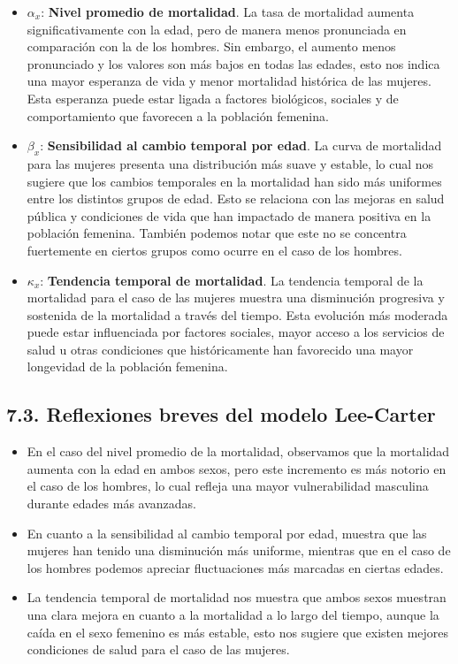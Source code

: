 \documentclass[
]{article}
\begin{document}
\begin{itemize}
\item
  \(\alpha_x\): \textbf{Nivel promedio de mortalidad}. La tasa de
  mortalidad aumenta significativamente con la edad, pero de manera
  menos pronunciada en comparación con la de los hombres. Sin embargo,
  el aumento menos pronunciado y los valores son más bajos en todas las
  edades, esto nos indica una mayor esperanza de vida y menor mortalidad
  histórica de las mujeres. Esta esperanza puede estar ligada a factores
  biológicos, sociales y de comportamiento que favorecen a la población
  femenina.
\item
  \(\beta_x\): \textbf{Sensibilidad al cambio temporal por edad}. La
  curva de mortalidad para las mujeres presenta una distribución más
  suave y estable, lo cual nos sugiere que los cambios temporales en la
  mortalidad han sido más uniformes entre los distintos grupos de edad.
  Esto se relaciona con las mejoras en salud pública y condiciones de
  vida que han impactado de manera positiva en la población femenina.
  También podemos notar que este no se concentra fuertemente en ciertos
  grupos como ocurre en el caso de los hombres.
\item
  \(\kappa_x\): \textbf{Tendencia temporal de mortalidad}. La tendencia
  temporal de la mortalidad para el caso de las mujeres muestra una
  disminución progresiva y sostenida de la mortalidad a través del
  tiempo. Esta evolución más moderada puede estar influenciada por
  factores sociales, mayor acceso a los servicios de salud u otras
  condiciones que históricamente han favorecido una mayor longevidad de
  la población femenina.
\end{itemize}

\hypertarget{reflexiones-breves-del-modelo-lee-carter}{%
\subsection{7.3. Reflexiones breves del modelo
Lee-Carter}\label{reflexiones-breves-del-modelo-lee-carter}}

\begin{itemize}
\item
  En el caso del nivel promedio de la mortalidad, observamos que la
  mortalidad aumenta con la edad en ambos sexos, pero este incremento es
  más notorio en el caso de los hombres, lo cual refleja una mayor
  vulnerabilidad masculina durante edades más avanzadas.
\item
  En cuanto a la sensibilidad al cambio temporal por edad, muestra que
  las mujeres han tenido una disminución más uniforme, mientras que en
  el caso de los hombres podemos apreciar fluctuaciones más marcadas en
  ciertas edades.
\item
  La tendencia temporal de mortalidad nos muestra que ambos sexos
  muestran una clara mejora en cuanto a la mortalidad a lo largo del
  tiempo, aunque la caída en el sexo femenino es más estable, esto nos
  sugiere que existen mejores condiciones de salud para el caso de las
  mujeres.
\end{itemize}
\end{document}
